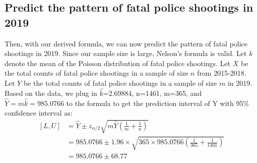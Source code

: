 \documentclass[a4paper]{article}
\begin{document}
{{\subsection{Predict the pattern of fatal police shootings in 2019}
\par{Then, with our derived formula, we can now predict the pattern of fatal police shootings in 2019. Since our sample size is large, Nelson's formula is valid. Let $k$ denote the mean of the Poisson distribution of fatal police shootings. Let $X$ be the total counts of fatal police shootings in a sample of size $n$ from 2015-2018. Let $Y$ be the total counts of fatal police shootings in a sample of size $m$ in 2019.  Based on the data, we plug in $\hat{k}$=2.69884, n=1461, m=365, and $\hat{Y}=m\hat{k}=985.0766$ to the formula to get the prediction interval of Y with 95$\%$ confidence interval as: }
\begin{equation}
\begin{split}
[L,U]&=\hat{Y}\pm z_{\alpha/2}\sqrt{m\hat{Y}(\frac{1}{m}+\frac{1}{n})}\\
     &=985.0766\pm1.96\times \sqrt{365\times 985.0766(\frac{1}{365}+\frac{1}{1461})}\\
     &=985.0766\pm68.77\\
\end{split}
\end{equation}
    
}}
\end{document}

